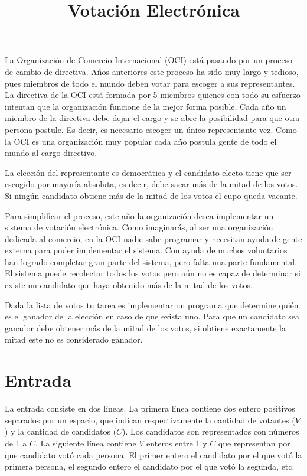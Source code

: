 \documentclass{article}
\title{Votación Electrónica}
\begin{document}
\maketitle

La Organización de Comercio Internacional (OCI) está pasando por un proceso de
cambio de directiva. Años anteriores este proceso ha sido muy largo y tedioso,
pues miembros de todo el mundo deben votar para escoger a sus representantes. La 
directiva de la OCI está formada por 5 miembros quienes con todo su esfuerzo
intentan que la organización funcione de la mejor forma posible. Cada año un
miembro de la directiva debe dejar el cargo y se abre la posibilidad para que
otra persona postule. Es decir, es necesario escoger un único representante vez.
Como la OCI es una organización muy popular cada año postula gente de todo el
mundo al cargo directivo.  

La elección del representante es democrática y el candidato electo tiene que ser
escogido por mayoría absoluta, es decir, debe sacar más de la mitad de los
votos. Si ningún candidato obtiene más de la mitad de los votos el cupo queda
vacante.

Para simplificar el proceso, este año la organización desea implementar un
sistema de votación electrónica. Como imaginarás, al ser una organización
dedicada al comercio, en la OCI nadie sabe programar y necesitan ayuda de gente
externa para poder implementar el sistema. Con ayuda de muchos voluntarios han
logrado completar gran parte del sistema, pero falta una parte fundamental. El
sistema puede recolectar todos los votos pero aún no es capaz de determinar si
existe un candidato que haya obtenido más de la mitad de los votos.

Dada la lista de votos tu tarea es implementar un programa que determine quién
es el ganador de la elección en caso de que exista uno. Para que un candidato
sea ganador debe obtener más de la mitad de los votos, si obtiene exactamente la
mitad este no es considerado ganador.

\section*{Entrada}
La entrada consiste en dos líneas. La primera línea contiene dos entero
positivos separados por un espacio, que indican respectivamente la cantidad de
votantes ($V$) y la cantidad de candidatos ($C$). Los candidatos son representados
con números de 1 a $C$. La siguiente línea contiene $V$ enteros entre 1 y $C$
que representan por que candidato votó cada persona. El primer entero el
candidato por el que votó la primera persona, el segundo entero el candidato por
el que votó la segunda, etc.
\end{document}
